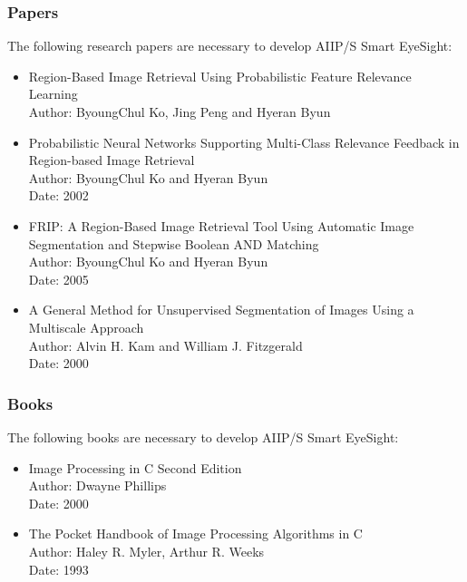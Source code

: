 \documentclass[12pt]{article}
\begin{document}
\subsubsection{Papers}
The following research papers are necessary to develop AIIP/S Smart EyeSight:
\begin{itemize}
  \item Region-Based Image Retrieval Using Probabilistic Feature Relevance Learning\\
        Author: ByoungChul Ko, Jing Peng and Hyeran Byun
  \item Probabilistic Neural Networks Supporting Multi-Class Relevance Feedback in Region-based Image Retrieval\\
        Author: ByoungChul Ko and Hyeran Byun\\
        Date: 2002
  \item FRIP: A Region-Based Image Retrieval Tool Using Automatic Image Segmentation and Stepwise Boolean AND Matching\\
        Author: ByoungChul Ko and Hyeran Byun\\
        Date: 2005
  \item A General Method for Unsupervised Segmentation of Images Using a Multiscale Approach\\
        Author: Alvin H. Kam and William J. Fitzgerald\\
        Date: 2000
\end{itemize}

\subsubsection{Books}
The following books are necessary to develop AIIP/S Smart EyeSight:
\begin{itemize}
  \item Image Processing in C Second Edition\\
        Author: Dwayne Phillips\\
        Date: 2000
  \item The Pocket Handbook of Image Processing Algorithms in C\\
        Author: Haley R. Myler, Arthur R. Weeks\\
        Date: 1993
\end{itemize}
\end{document}
